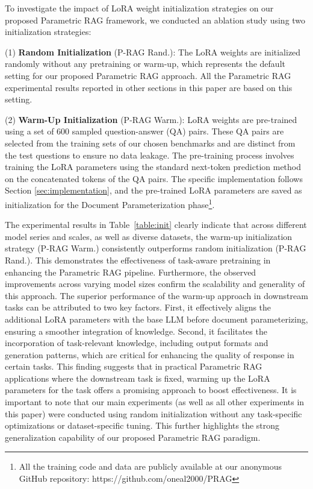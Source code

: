\documentclass[sigconf,natbib=true,anonymous=false]{acmart}
\begin{document}
To investigate the impact of LoRA weight initialization strategies on our proposed Parametric RAG framework, we conducted an ablation study using two initialization strategies:


\noindent (1) \textbf{Random Initialization} (P-RAG Rand.): 
The LoRA weights are initialized randomly without any pretraining or warm-up, which represents the default setting for our proposed Parametric RAG approach. 
{All the Parametric RAG experimental results reported in other sections in this paper are based on this setting.}

\noindent (2) \textbf{Warm-Up Initialization} (P-RAG Warm.):  LoRA weights are pre-trained using a set of 600 sampled question-answer (QA) pairs. 
These QA pairs are selected from the training sets of our chosen benchmarks and are distinct from the test questions to ensure no data leakage. 
The pre-training process involves training the LoRA parameters using the standard next-token prediction method on the concatenated tokens of the QA pairs. 
The specific implementation follows Section \ref{sec:implementation}, and the pre-trained LoRA parameters are saved as initialization for the Document Parameterization phase\footnote{All the training code and data are publicly available at our anonymous GitHub repository: https://github.com/oneal2000/PRAG}.









The experimental results in Table~\ref{table:init} clearly indicate that across different model series and scales, as well as diverse datasets, the warm-up initialization strategy (P-RAG Warm.) consistently outperforms random initialization (P-RAG Rand.). 
This demonstrates the effectiveness of task-aware pretraining in enhancing the Parametric RAG pipeline. 
Furthermore, the observed improvements across varying model sizes confirm the scalability and generality of this approach. 
The superior performance of the warm-up approach in downstream tasks can be attributed to two key factors. First, it effectively aligns the additional LoRA parameters with the base LLM before document parameterizing, ensuring a smoother integration of knowledge. 
Second, it facilitates the incorporation of task-relevant knowledge, including output formats and generation patterns, which are critical for enhancing the quality of response in certain tasks.
This finding suggests that in practical Parametric RAG applications where the downstream task is fixed, warming up the LoRA parameters for the task offers a promising approach to boost effectiveness.
{It is important to note that our main experiments (as well as all other experiments in this paper) were conducted using random initialization without any task-specific optimizations or dataset-specific tuning. This further highlights the strong generalization capability of our proposed Parametric RAG paradigm. }
\end{document}
